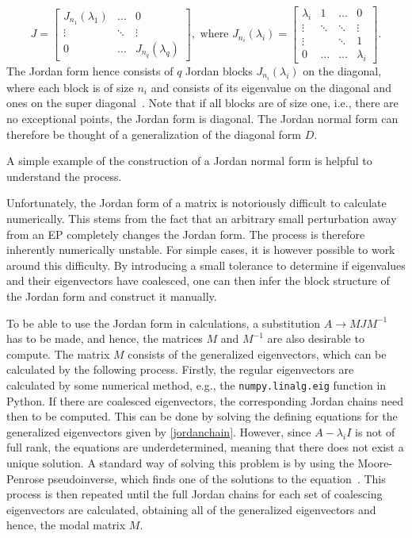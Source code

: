 \documentclass[../main.tex]{subfiles}
\begin{document}
\begin{equation}\label{eq:jordan}
    J = \begin{bmatrix}J_{n_1}(\lambda_1) & \dots & 0 \\
                            \vdots & \ddots & \vdots \\
                        0 & \dots &  J_{n_q}(\lambda_q)\end{bmatrix}, \text{ where }
       J_{n_i}(\lambda_i) = \begin{bmatrix} \lambda_i & 1 & \dots & 0 \\
                                                    \vdots  & \ddots & \ddots & \vdots \\
                                                    \vdots & & \ddots& 1 \\
                                                    0 & \dots & \dots & \lambda_i\end{bmatrix}.
\end{equation}
The Jordan form hence consists of $q$ Jordan blocks $J_{n_i}(\lambda_i)$ on the diagonal, where each block is of size $n_i$ and consists of its eigenvalue on the diagonal and ones on the super diagonal~\cite{uffe}. Note that if all blocks are of size one, i.e., there are no exceptional points, the Jordan form is diagonal. The Jordan normal form can therefore be thought of a generalization of the diagonal form $D$.

A simple example of the construction of a Jordan normal form is helpful to understand the process.

Unfortunately, the Jordan form of a matrix is notoriously difficult to calculate numerically. This stems from the fact that an arbitrary small perturbation away from an EP completely changes the Jordan form. The process is therefore inherently numerically unstable. For simple cases, it is however possible to work around this difficulty. By introducing a small tolerance to determine if eigenvalues and their eigenvectors have coalesced, one can then infer the block structure of the Jordan form and construct it manually.

To be able to use the Jordan form in calculations, a substitution $A\rightarrow MJM^{-1}$ has to be made, and hence, the matrices $M$ and $M^{-1}$ are also desirable to compute. The matrix $M$ consists of the generalized eigenvectors, which can be calculated by the following process. Firstly, the regular eigenvectors are calculated by some numerical method, e.g., the \verb+numpy.linalg.eig+ function in Python. If there are coalesced eigenvectors, the corresponding Jordan chains need then to be computed. This can be done by solving the defining equations for the generalized eigenvectors given by \cref{jordanchain}. However, since $A-\lambda_iI$ is not of full rank, the equations are underdetermined, meaning that there does not exist a unique solution. A standard way of solving this problem is by using the Moore-Penrose pseudoinverse, which finds one of the solutions to the equation~\cite{uffe}. This process is then repeated until the full Jordan chains for each set of coalescing eigenvectors are calculated, obtaining all of the generalized eigenvectors and hence, the modal matrix $M$. 
\end{document}
